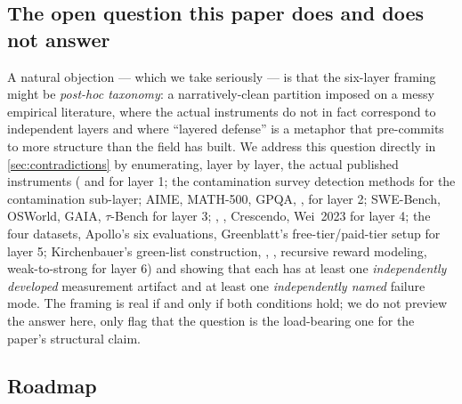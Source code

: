 \subsection*{The open question this paper does and does not answer}

A natural objection --- which we take seriously --- is that the
six-layer framing might be \emph{post-hoc taxonomy}: a
narratively-clean partition imposed on a messy empirical
literature, where the actual instruments do not in fact correspond
to independent layers and where ``layered defense'' is a metaphor
that pre-commits to more structure than the field has built. We
address this question directly in \cref{sec:contradictions} by
enumerating, layer by layer, the actual published instruments
( and  for layer 1; the contamination survey
detection methods for the contamination sub-layer; AIME, MATH-500,
GPQA, ,  for layer 2; SWE-Bench, OSWorld, GAIA,
$\tau$-Bench for layer 3; , , Crescendo,
Wei~2023 for layer 4; the four  datasets, Apollo's six
 evaluations, Greenblatt's free-tier/paid-tier setup for
layer 5; Kirchenbauer's green-list construction, , ,
recursive reward modeling, weak-to-strong for layer 6) and showing
that each has at least one \emph{independently developed} measurement
artifact and at least one \emph{independently named} failure mode.
The framing is real if and only if both conditions hold; we do not
preview the answer here, only flag that the question is the
load-bearing one for the paper's structural claim.

\subsection*{Roadmap}

